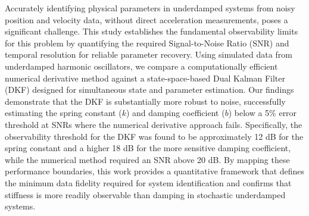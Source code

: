 \documentclass[]{article}
\begin{document}
Accurately identifying physical parameters in underdamped systems from noisy position and velocity data, without direct acceleration measurements, poses a significant challenge. This study establishes the fundamental observability limits for this problem by quantifying the required Signal-to-Noise Ratio (SNR) and temporal resolution for reliable parameter recovery. Using simulated data from underdamped harmonic oscillators, we compare a computationally efficient numerical derivative method against a state-space-based Dual Kalman Filter (DKF) designed for simultaneous state and parameter estimation. Our findings demonstrate that the DKF is substantially more robust to noise, successfully estimating the spring constant ($k$) and damping coefficient ($b$) below a 5\% error threshold at SNRs where the numerical derivative approach fails. Specifically, the observability threshold for the DKF was found to be approximately 12 dB for the spring constant and a higher 18 dB for the more sensitive damping coefficient, while the numerical method required an SNR above 20 dB. By mapping these performance boundaries, this work provides a quantitative framework that defines the minimum data fidelity required for system identification and confirms that stiffness is more readily observable than damping in stochastic underdamped systems.
\end{document}
